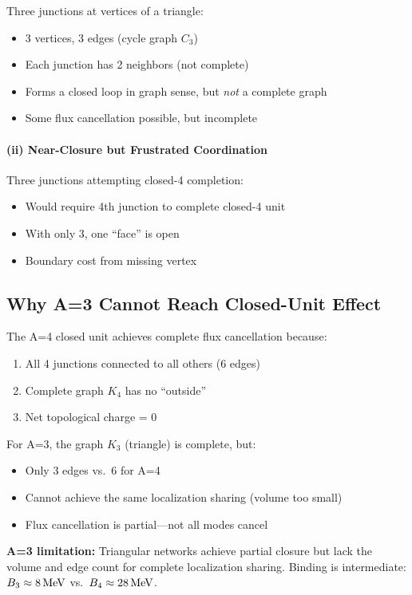 Three junctions at vertices of a triangle:
\begin{itemize}
    \item 3 vertices, 3 edges (cycle graph $C_3$)
    \item Each junction has 2 neighbors (not complete)
    \item Forms a closed loop in graph sense, but \emph{not} a complete graph
    \item Some flux cancellation possible, but incomplete
\end{itemize}

\paragraph{(ii) Near-Closure but Frustrated Coordination}

Three junctions attempting closed-4 completion:
\begin{itemize}
    \item Would require 4th junction to complete closed-4 unit
    \item With only 3, one ``face'' is open
    \item Boundary cost from missing vertex
\end{itemize}

\subsection{Why A=3 Cannot Reach Closed-Unit Effect}

The A=4 closed unit achieves complete flux cancellation because:
\begin{enumerate}
    \item All 4 junctions connected to all others (6 edges)
    \item Complete graph $K_4$ has no ``outside''
    \item Net topological charge = 0
\end{enumerate}

For A=3, the graph $K_3$ (triangle) is complete, but:
\begin{itemize}
    \item Only 3 edges vs.\ 6 for A=4
    \item Cannot achieve the same localization sharing (volume too small)
    \item Flux cancellation is partial---not all modes cancel
\end{itemize}

\begin{resultbox}
    \textbf{A=3 limitation:} Triangular networks achieve partial closure
    but lack the volume and edge count for complete localization sharing.
    Binding is intermediate: $B_3 \approx 8\,\mathrm{MeV}$ vs.\ $B_4 \approx 28\,\mathrm{MeV}$.
    \tagP
\end{resultbox}

